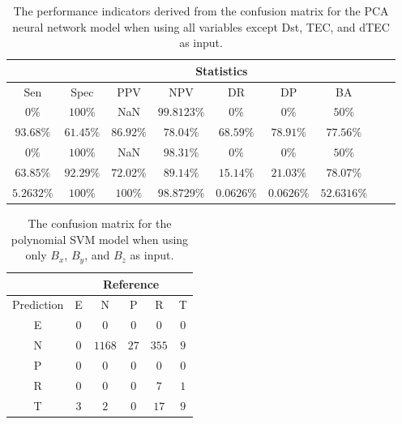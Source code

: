\begin{table}[!ht]
	\centering
	\begin{tabular}{|c|c|c|c|c|c|c|c|c|}
		\hline
		 & \multicolumn{7}{c|}{Statistics} \\ \hline
		Sen & Spec & PPV & NPV & DR & DP & BA \\ \hline
		$0\%$ & $100\%$ & NaN & $99.8123\%$ & $0\%$ & $0\%$ & $50\%$ \\ \hline
		$93.68\%$ & $61.45\%$ & $86.92\%$ & $78.04\%$ & $68.59\%$ & $78.91\%$ & $77.56\%$ \\ \hline
		$0\%$ & $100\%$ & NaN & $98.31\%$ & $0\%$ & $0\%$ & $50\%$ \\ \hline
		$63.85\%$ & $92.29\%$ & $72.02\%$ & $89.14\%$ & $15.14\%$ & $21.03\%$ & $78.07\%$ \\ \hline
		$5.2632\%$ & $100\%$ & $100\%$ & $98.8729\%$ & $0.0626\%$ & $0.0626\%$ & $52.6316\%$ \\ \hline
	\end{tabular}
	\caption{The performance indicators derived from the confusion matrix for the PCA neural network model when using all variables except Dst, TEC, and dTEC as input.}
	\label{tab:cs:noTEC:pcaNNet}
\end{table}

\begin{table}[!ht]
	\centering
	\begin{tabular}{|c|c|c|c|c|c|}
		\hline
		 & \multicolumn{5}{|c|}{Reference} \\ \hline
		 Prediction & E & N & P & R & T \\ \hline
		 E & $0$ & $0$ & $0$ & $0$ & $0$ \\ \hline
		 N & $0$ & $1168$ & $27$ & $355$ & $9$ \\ \hline
		 P & $0$ & $0$ & $0$ & $0$ & $0$ \\ \hline
		 R & $0$ & $0$ & $0$ & $7$ & $1$ \\ \hline
		 T & $3$ & $2$ & $0$ & $17$ & $9$ \\ \hline
	\end{tabular}
	\caption{The confusion matrix for the polynomial SVM model when using only $B_{x}$, $B_{y}$, and $B_{z}$ as input.}
	\label{tab:cm:coord:svmPoly}
\end{table}

